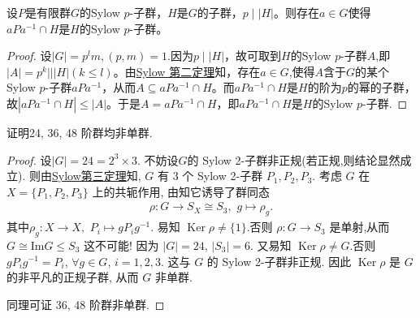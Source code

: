 \documentclass[../../main.tex]{subfiles}%
\begin{document}
\begin{example}
设$P$是有限群$G$的Sylow $p$-子群，$H$是$G$的子群，$p\mid |H|$。则存在$a\in G$使得$aPa^{-1}\cap H$是$H$的Sylow $p$-子群。
\end{example}
\begin{proof}
设$|G|=p^lm,(p,m)=1$.因为$p\mid |H|$，故可取到$H$的Sylow $p$-子群$A$,即$|A|=p^k|||H|(k\leqslant l)$。由\hyperref[theorem:Sylow 第二定理]{Sylow 第二定理}知，存在$a\in G$,使得$A$含于$G$的某个Sylow $p$-子群$aPa^{-1}$，从而$A\subseteq aPa^{-1}\cap H$。而$aPa^{-1}\cap H$是$H$的阶为$p$的幂的子群，故$|aPa^{-1}\cap H|\leqslant |A|$。于是$A = aPa^{-1}\cap H$，即$aPa^{-1}\cap H$是$H$的Sylow $p$-子群.
\end{proof}

\begin{example}
证明24, 36, 48 阶群均非单群.
\end{example}
\begin{proof}
设$|G|=24=2^3\times 3$. 不妨设$G$的 Sylow 2-子群非正规(若正规,则结论显然成立). 则由\hyperref[theorem:Sylow第三定理]{Sylow第三定理}知, $G$ 有 3 个 Sylow 2-子群 $P_1,P_2,P_3$. 考虑 $G$ 在 $X=\{P_1,P_2,P_3\}$ 上的共轭作用, 由知它诱导了群同态
\begin{align*}
\rho:G\to S_X\cong S_3,\,\,g\mapsto \rho_g.
\end{align*}
其中$\rho_g:X\to X,\,\,P_i\mapsto gP_ig^{-1}.$
易知 $\operatorname{Ker}\rho\neq \{1\}$.否则 $\rho:G\to S_3$ 是单射,从而$G\cong \text{Im}G\leqslant S_3$ 这不可能! 因为 $|G|=24$, $|S_3|=6$.
又易知 $\operatorname{Ker}\rho\neq G$.否则 $gP_ig^{-1}=P_i$, $\forall g\in G$, $i=1,2,3$. 这与 $G$ 的 Sylow 2-子群非正规.
因此 $\operatorname{Ker}\rho$ 是 $G$ 的非平凡的正规子群, 从而 $G$ 非单群.

同理可证 36, 48 阶群非单群.
\end{proof}
\end{document}
